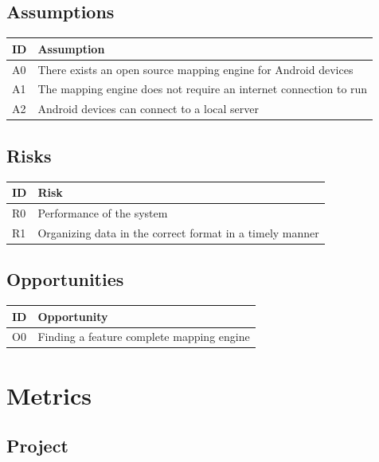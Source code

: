 \documentclass{article}
\begin{document}
\subsection{Assumptions}
\begin{tabular}{ | p{.5in} | p{4.5in} | }
\hline
\textbf{ID} & \textbf{Assumption}\\
\hline
\hline
A0 & There exists an open source mapping engine for Android devices\\
\hline
A1 & The mapping engine does not require an internet connection to run\\
\hline
A2 & Android devices can connect to a local server\\
\hline
\end{tabular}

\subsection{Risks}
\begin{tabular}{ | p{.5in} | p{4.5in} | }
\hline
\textbf{ID} & \textbf{Risk}\\
\hline
\hline
R0 & Performance of the system\\
\hline
R1 & Organizing data in the correct format in a timely manner\\
\hline
\end{tabular}

\subsection{Opportunities}
\begin{tabular}{ | p{.5in} | p{4.5in} | }
\hline
\textbf{ID} & \textbf{Opportunity}\\
\hline
\hline
O0 & Finding a feature complete mapping engine\\
\hline
\end{tabular}

\section{Metrics}
\subsection{Project}
\end{document}
